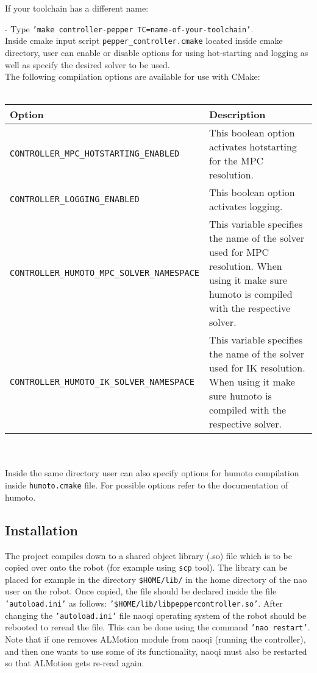 \noindent If your toolchain has a different name:

- Type \texttt{'make controller-pepper TC=name-of-your-toolchain'}.\\

\noindent Inside cmake input script \texttt{pepper\_controller.cmake} located inside cmake directory, user can enable or disable
options for using hot-starting and logging as well as specify the desired solver to be used.\\

\noindent The following compilation options are available for use with CMake:\\ \\
\begin{tabular}{|l|p{5cm}|}
\hline
Option & Description \\
\hline
\texttt{CONTROLLER\_MPC\_HOTSTARTING\_ENABLED} & This boolean option activates hotstarting for the MPC resolution.\\
\hline
\texttt{CONTROLLER\_LOGGING\_ENABLED} & This boolean option activates logging.\\ \hline
\texttt{CONTROLLER\_HUMOTO\_MPC\_SOLVER\_NAMESPACE} & This variable specifies the name of the solver used for
MPC resolution. When using it make sure humoto is compiled with the respective solver. \\ \hline
\texttt{CONTROLLER\_HUMOTO\_IK\_SOLVER\_NAMESPACE} & This variable specifies the name of the solver used for IK
resolution. When using it make sure humoto is compiled with the respective solver.\\ 
\hline
\end{tabular} \\ \\

\noindent Inside the same directory user can also specify options for humoto compilation inside \texttt{humoto.cmake} file.
For possible options refer to the documentation of humoto.

\subsection{Installation}
\noindent The project compiles down to a shared object library (.so) file which is to be copied over onto the robot (for example
using \texttt{scp} tool). The library can be placed for example in the directory \texttt{\$HOME/lib/} in the home directory of the nao user on the
robot. Once copied, the file should be declared inside the file \texttt{'autoload.ini'} as follows:
\texttt{'\$HOME/lib/libpeppercontroller.so'}. After changing the \texttt{'autoload.ini'} file naoqi operating system of the robot should be
rebooted to reread the file. This can be done using the command \texttt{'nao restart'}. Note that if one removes ALMotion
module from naoqi (running the controller), and then one wants to use some of its functionality, naoqi must also be
restarted so that ALMotion gets re-read again.\\ 

